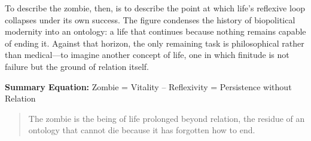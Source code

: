 \documentclass[11pt]{article}
\begin{document}
To describe the zombie, then, is to describe the point at which life’s reflexive loop collapses under its own success. The figure condenses the history of biopolitical modernity into an ontology: a life that continues because nothing remains capable of ending it. Against that horizon, the only remaining task is philosophical rather than medical—to imagine another concept of life, one in which finitude is not failure but the ground of relation itself.

\begin{center}
\textbf{Summary Equation:}
Zombie = Vitality – Reflexivity = Persistence without Relation
\end{center}

\begin{quote}
The zombie is the being of life prolonged beyond relation,
the residue of an ontology that cannot die because it has forgotten how to end.
\end{quote}
\end{document}
